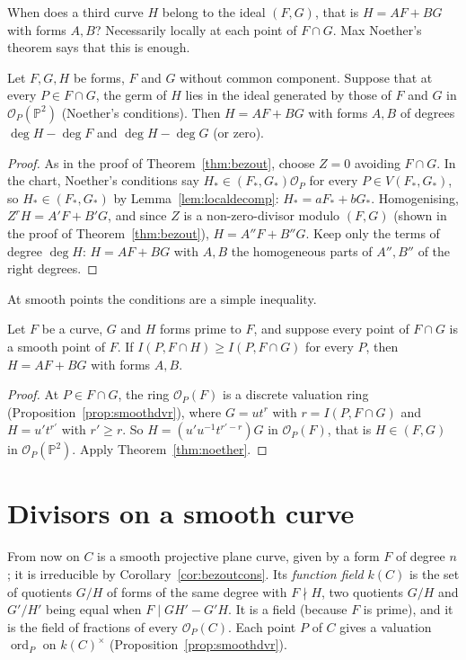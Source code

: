 When does a third curve $H$ belong to the ideal $(F,G)$, that is $H=AF+BG$ with forms $A,B$? Necessarily locally at each point of $F\cap G$.
Max Noether's theorem says that this is enough.

\begin{theorem}\label{thm:noether}
Let $F,G,H$ be forms, $F$ and $G$ without common component. Suppose that at every $P\in F\cap G$, the germ of $H$ lies in the ideal generated by
those of $F$ and $G$ in $\mathcal O_P(\mathbb P^2)$ (Noether's conditions). Then $H=AF+BG$ with forms $A,B$ of degrees $\deg H-\deg F$ and
$\deg H-\deg G$ (or zero).
\end{theorem}
\begin{proof}
As in the proof of Theorem~\ref{thm:bezout}, choose $Z=0$ avoiding $F\cap G$. In the chart, Noether's conditions say $H_*\in(F_*,G_*)\mathcal O_P$ for
every $P\in V(F_*,G_*)$, so $H_*\in(F_*,G_*)$ by Lemma~\ref{lem:localdecomp}: $H_*=aF_*+bG_*$. Homogenising, $Z^rH=A'F+B'G$, and since $Z$ is a non-zero-divisor
modulo $(F,G)$ (shown in the proof of Theorem~\ref{thm:bezout}), $H=A''F+B''G$. Keep only the terms of degree $\deg H$: $H=AF+BG$ with $A,B$ the homogeneous
parts of $A'',B''$ of the right degrees.
\end{proof}

At smooth points the conditions are a simple inequality.

\begin{corollary}\label{cor:noethersmooth}
Let $F$ be a curve, $G$ and $H$ forms prime to $F$, and suppose every point of $F\cap G$ is a smooth point of $F$. If
$I(P,F\cap H)\ge I(P,F\cap G)$ for every $P$, then $H=AF+BG$ with forms $A,B$.
\end{corollary}
\begin{proof}
At $P\in F\cap G$, the ring $\mathcal O_P(F)$ is a discrete valuation ring (Proposition~\ref{prop:smoothdvr}), where $G=ut^r$ with
$r=I(P,F\cap G)$ and $H=u't^{r'}$ with $r'\ge r$. So $H=(u'u^{-1}t^{r'-r})G$ in $\mathcal O_P(F)$, that is $H\in(F,G)$ in
$\mathcal O_P(\mathbb P^2)$. Apply Theorem~\ref{thm:noether}.
\end{proof}

\section{Divisors on a smooth curve}

From now on $C$ is a smooth projective plane curve, given by a form $F$ of degree $n$; it is irreducible by Corollary~\ref{cor:bezoutcons}.
Its \emph{function field} $k(C)$ is the set of quotients $G/H$ of forms of the same degree with $F\nmid H$, two quotients $G/H$ and $G'/H'$ being
equal when $F\mid GH'-G'H$. It is a field (because $F$ is prime), and it is the field of fractions of every $\mathcal O_P(C)$. Each point
$P$ of $C$ gives a valuation $\operatorname{ord}_P$ on $k(C)^\times$ (Proposition~\ref{prop:smoothdvr}).

